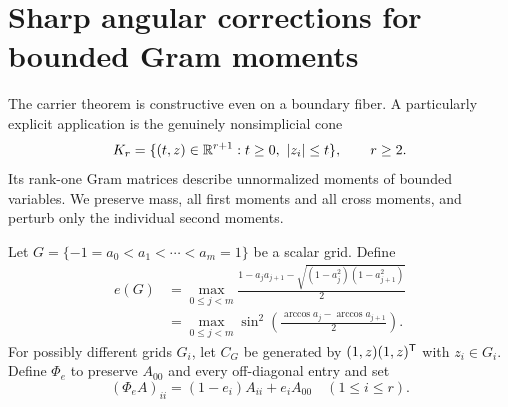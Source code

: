 \section{Sharp angular corrections for bounded Gram moments}\label{sec:angular}
The carrier theorem is constructive even on a boundary fiber. A particularly explicit application is the genuinely nonsimplicial cone
\[
 K_r=\{(t,z)\in\mathbb R^{r+1}:t\ge0,\ |z_i|\le t\},\qquad r\ge2.
\]
Its rank-one Gram matrices describe unnormalized moments of bounded variables. We preserve mass, all first moments and all cross moments, and perturb only the individual second moments.

Let $G=\{-1=a_0<a_1<\cdots<a_m=1\}$ be a scalar grid. Define
\begin{align}
 e(G)&=\max_{0\le j<m}\frac{1-a_ja_{j+1}-\sqrt{(1-a_j^2)(1-a_{j+1}^2)}}2\label{eq:eg}\\
 &=\max_{0\le j<m}\sin^2\left(\frac{\arccos a_j-\arccos a_{j+1}}2\right).
\end{align}
For possibly different grids $G_i$, let $C_G$ be generated by $(1,z)(1,z)^{\mathsf T}$ with $z_i\in G_i$. Define $\Phi_e$ to preserve $A_{00}$ and every off-diagonal entry and set
\begin{equation}\label{eq:phie}
 (\Phi_e A)_{ii}=(1-e_i)A_{ii}+e_iA_{00}\quad(1\le i\le r).
\end{equation}

